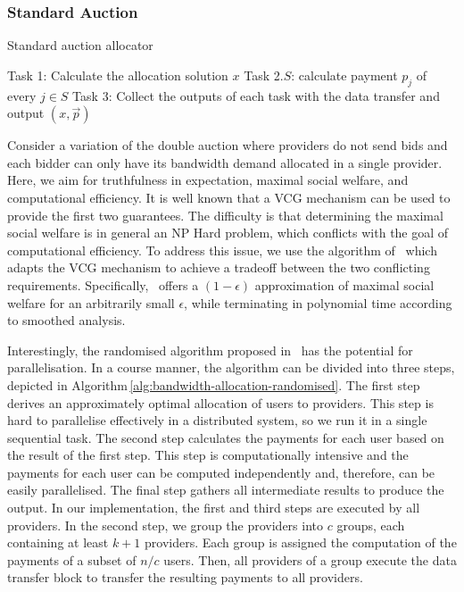 \subsubsection{Standard Auction}
\label{sec:instances-vcg}

\begin{algorithm}[tbp]
	\caption{Standard auction allocator}
	\label{alg:bandwidth-allocation-randomised}
	\small

	\begin{algorithmic}[1]
		\State Task 1: Calculate the allocation solution $x$
			\State Task 2.$S$: calculate payment $p_j$ of every $j \in S$
		\EndFor
		\State Task 3: Collect the outputs of each task with the data transfer and output $(x,\vec{p})$
	\end{algorithmic}

\end{algorithm}

Consider a variation of the double auction where providers
do not send bids and each bidder can only have its bandwidth demand
allocated in a single provider. Here, we aim for truthfulness
in expectation, maximal social welfare, and computational efficiency.
It is well known that a VCG mechanism can be used to provide the first two guarantees.
The difficulty is that determining the maximal
social welfare is in general an NP Hard problem,
which conflicts with the goal of computational efficiency.
To address this issue, we use the algorithm of~\cite{Zhang2015Truthful}
which adapts the VCG mechanism to achieve a tradeoff
between the two conflicting requirements. Specifically,
\cite{Zhang2015Truthful}~offers a $(1-\epsilon)$ approximation
of maximal social welfare for an arbitrarily small $\epsilon$,
while terminating in polynomial time according to smoothed analysis.

Interestingly, the randomised algorithm proposed
in~\cite{Zhang2015Truthful} has the potential for parallelisation.
In a course manner, the algorithm can be divided into three steps, depicted
in Algorithm\,\ref{alg:bandwidth-allocation-randomised}. The first
step derives an approximately optimal allocation of users to providers.
This step is hard to parallelise effectively in a distributed system,
so we run it in a single sequential task.
The second step calculates the payments for each user based on the result of the first step.
This step is computationally intensive and the payments for each user can be computed
independently and, therefore, can be easily parallelised.
The final step gathers all intermediate results to produce the output.
In our implementation, the first and third steps are executed by all providers.
In the second step, we group the providers into $c$ groups, each containing at least $k+1$
providers. Each group is assigned the computation of the payments
of a subset of $n/c$ users. Then, all providers of a group
execute the data transfer block to transfer the resulting payments to all providers.
